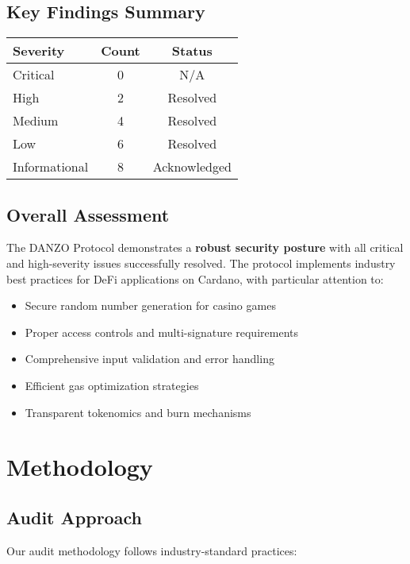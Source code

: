 \documentclass[11pt,a4paper]{article}
\begin{document}
\subsection{Key Findings Summary}
\begin{center}
\begin{tabular}{|l|c|c|}
\hline
\textbf{Severity} & \textbf{Count} & \textbf{Status} \\
\hline
Critical & 0 & N/A \\
High & 2 & \textcolor{danzoGreen}{Resolved} \\
Medium & 4 & \textcolor{danzoGreen}{Resolved} \\
Low & 6 & \textcolor{danzoGreen}{Resolved} \\
Informational & 8 & \textcolor{danzoGreen}{Acknowledged} \\
\hline
\end{tabular}
\end{center}

\subsection{Overall Assessment}
The DANZO Protocol demonstrates a \textbf{robust security posture} with all critical and high-severity issues successfully resolved. The protocol implements industry best practices for DeFi applications on Cardano, with particular attention to:

\begin{itemize}
    \item Secure random number generation for casino games
    \item Proper access controls and multi-signature requirements
    \item Comprehensive input validation and error handling
    \item Efficient gas optimization strategies
    \item Transparent tokenomics and burn mechanisms
\end{itemize}

\section{Methodology}

\subsection{Audit Approach}
Our audit methodology follows industry-standard practices:
\end{document}
